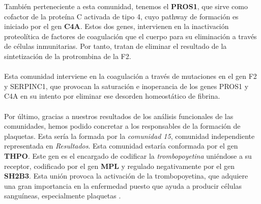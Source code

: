 También perteneciente a esta comunidad, tenemos el \textbf{PROS1}, que sirve como cofactor de la proteína C activada de tipo 4, cuyo pathway de formación es iniciado por el gen \textbf{C4A}. Estos dos genes, intervienen en la inactivación proteolítica de factores de coagulación que el cuerpo para su eliminación a través de células inmunitarias. Por tanto, tratan de eliminar el resultado de la sintetización de la protrombina de la F2.\\\\ Esta comunidad interviene en la coagulación a través de mutaciones en el gen F2 y SERPINC1, que provocan la saturación e inoperancia de los genes PROS1 y C4A en su intento por eliminar ese desorden homeostático de fibrina.\\\\
Por último, gracias a nuestros resultados de los análisis funcionales de las comunidades, hemos podido concretar a los responsables de la formación de plaquetas. Esta sería la formada por la \textit{comunidad 15}, comunidad independiente representada en \textit{Resultados}. Esta comunidad estaría conformada por el gen \textbf{THPO}. Este gen es el encargado de codificar la \textit{trombopoyetina} uniéndose a su receptor\cite{THPO_MPL}, codificado por el gen \textbf{MPL}\cite{THPO_MPL} y regulado negativamente por el gen \textbf{SH2B3}\cite{THPO_MPL}. Esta unión provoca la activación de la trombopoyetina, que adquiere una gran importancia en la enfermedad puesto que ayuda a producir células sanguíneas, especialmente plaquetas \cite{THPO_MPL}.  


